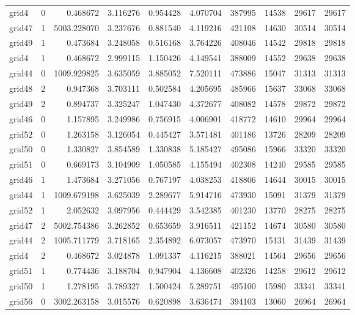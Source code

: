 \begin{longtable}{|l|r|r|r|r|r|r|r|r|r|}
grid4 & 0 & 0.468672 & 3.116276 & 0.954428 & 4.070704 & 387995 & 14538 & 29617 & 29617 \\
grid47 & 1 & 5003.228070 & 3.237676 & 0.881540 & 4.119216 & 421108 & 14630 & 30514 & 30514 \\
grid49 & 1 & 0.473684 & 3.248058 & 0.516168 & 3.764226 & 408046 & 14542 & 29818 & 29818 \\
grid4 & 1 & 0.468672 & 2.999115 & 1.150426 & 4.149541 & 388009 & 14552 & 29638 & 29638 \\
grid44 & 0 & 1009.929825 & 3.635059 & 3.885052 & 7.520111 & 473886 & 15047 & 31313 & 31313 \\
grid48 & 2 & 0.947368 & 3.703111 & 0.502584 & 4.205695 & 485966 & 15637 & 33068 & 33068 \\
grid49 & 2 & 0.894737 & 3.325247 & 1.047430 & 4.372677 & 408082 & 14578 & 29872 & 29872 \\
grid46 & 0 & 1.157895 & 3.249986 & 0.756915 & 4.006901 & 418772 & 14610 & 29964 & 29964 \\
grid52 & 0 & 1.263158 & 3.126054 & 0.445427 & 3.571481 & 401186 & 13726 & 28209 & 28209 \\
grid50 & 0 & 1.330827 & 3.854589 & 1.330838 & 5.185427 & 495086 & 15966 & 33320 & 33320 \\
grid51 & 0 & 0.669173 & 3.104909 & 1.050585 & 4.155494 & 402308 & 14240 & 29585 & 29585 \\
grid46 & 1 & 1.473684 & 3.271056 & 0.767197 & 4.038253 & 418806 & 14644 & 30015 & 30015 \\
grid44 & 1 & 1009.679198 & 3.625039 & 2.289677 & 5.914716 & 473930 & 15091 & 31379 & 31379 \\
grid52 & 1 & 2.052632 & 3.097956 & 0.444429 & 3.542385 & 401230 & 13770 & 28275 & 28275 \\
grid47 & 2 & 5002.754386 & 3.262852 & 0.653659 & 3.916511 & 421152 & 14674 & 30580 & 30580 \\
grid44 & 2 & 1005.711779 & 3.718165 & 2.354892 & 6.073057 & 473970 & 15131 & 31439 & 31439 \\
grid4 & 2 & 0.468672 & 3.024878 & 1.091337 & 4.116215 & 388021 & 14564 & 29656 & 29656 \\
grid51 & 1 & 0.774436 & 3.188704 & 0.947904 & 4.136608 & 402326 & 14258 & 29612 & 29612 \\
grid50 & 1 & 1.278195 & 3.789327 & 1.500424 & 5.289751 & 495100 & 15980 & 33341 & 33341 \\
grid56 & 0 & 3002.263158 & 3.015576 & 0.620898 & 3.636474 & 394103 & 13060 & 26964 & 26964 \\

\end{longtable}
